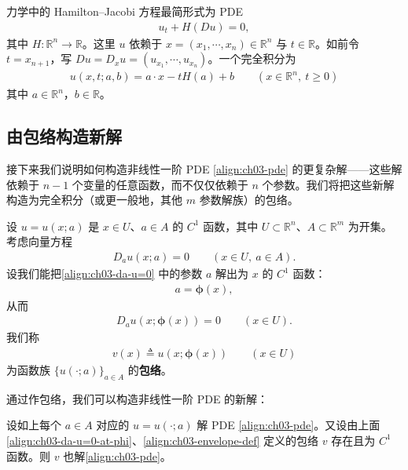 \documentclass[../../main.tex]{subfiles}
\begin{document}
\begin{example}\label{example:ch04-3-3-8}
力学中的 Hamilton--Jacobi 方程最简形式为 PDE
\begin{align}\label{align:ch03-hj}
u_t+H(Du)=0,
\end{align}
其中 $H:\mathbb{R}^n\to\mathbb{R}$。这里 $u$ 依赖于 $x=(x_1,\cdots,x_n)\in\mathbb{R}^n$ 与 $t\in\mathbb{R}$。如前令 $t=x_{n+1}$，写 $Du=D_x u=(u_{x_1},\cdots,u_{x_n})$。一个完全积分为
\begin{align}\label{align:ch03-hj-int}
u(x,t;a,b)=a\cdot x-tH(a)+b \qquad (x\in\mathbb{R}^n,\ t\geqslant 0)
\end{align}
其中 $a\in\mathbb{R}^n$，$b\in\mathbb{R}$。
\end{example}

\subsection{由包络构造新解}\label{subsection:ch03-envelope}

接下来我们说明如何构造非线性一阶 PDE \eqref{align:ch03-pde} 的更复杂解——这些解依赖于 $n-1$ 个变量的任意函数，而不仅仅依赖于 $n$ 个参数。我们将把这些新解构造为完全积分（或更一般地，其他 $m$ 参数解族）的包络。

\begin{definition}\label{definition:ch03-envelope}
设 $u=u(x;a)$ 是 $x\in U$、$a\in A$ 的 $C^1$ 函数，其中 $U\subset\mathbb{R}^n$、$A\subset\mathbb{R}^m$ 为开集。考虑向量方程
\begin{align}\label{align:ch03-da-u=0}
D_a u(x;a)=0 \qquad (x\in U,\ a\in A).
\end{align}
设我们能把\eqref{align:ch03-da-u=0} 中的参数 $a$ 解出为 $x$ 的 $C^1$ 函数：
\begin{align}\label{align:ch03-a=phi}
a=\boldsymbol{\phi}(x),
\end{align}
从而
\begin{align}\label{align:ch03-da-u=0-at-phi}
D_a u(x;\boldsymbol{\phi}(x))=0 \qquad (x\in U).
\end{align}
我们称
\begin{align}\label{align:ch03-envelope-def}
v(x)\triangleq u(x;\boldsymbol{\phi}(x)) \qquad (x\in U)
\end{align}
为函数族 $\{u(\cdot;a)\}_{a\in A}$ 的\textbf{包络}。
\end{definition}

通过作包络，我们可以构造非线性一阶 PDE 的新解：

\begin{theorem}[新解的构造]\label{theorem:ch03-envelope}设如上每个 $a\in A$ 对应的 $u=u(\cdot;a)$ 解 PDE \eqref{align:ch03-pde}。又设由上面\eqref{align:ch03-da-u=0-at-phi}、\eqref{align:ch03-envelope-def} 定义的包络 $v$ 存在且为 $C^1$ 函数。则 $v$ 也解\eqref{align:ch03-pde}。
\end{theorem}
\end{document}
